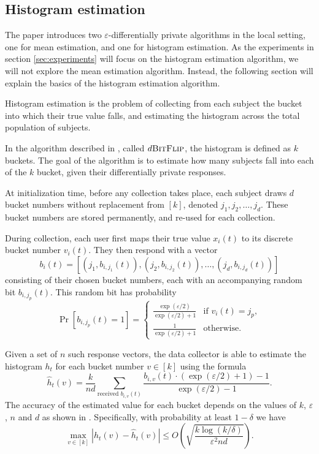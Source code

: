 \documentclass[a4paper,12pt]{article}
\renewcommand{\epsilon}{\varepsilon}
\begin{document}
\subsection{Histogram estimation \label{sec:histogram_algo}}

The paper introduces two $\epsilon$-differentially private algorithms in the local setting, one for mean estimation, and one for histogram estimation. As the experiments in section \ref{sec:experiments} will focus on the histogram estimation algorithm, we will not explore the mean estimation algorithm. Instead, the following section will explain the basics of the histogram estimation algorithm. 

Histogram estimation is the problem of collecting from each subject the bucket into which their true value falls, and estimating the histogram across the total population of subjects.

In the algorithm described in \cite{microsoft_telemetry}, called $d\textsc{BitFlip}$, the histogram is defined as $k$ buckets. The goal of the algorithm is to estimate how many subjects fall into each of the $k$ bucket, given their differentially private responses.

At initialization time, before any collection takes place, each subject draws $d$ bucket numbers without replacement from $[k]$, denoted $j_1,j_2,\dots,j_d$. These bucket numbers are stored permanently, and re-used for each collection.

During collection, each user first maps their true value $x_i(t)$ to its discrete bucket number $v_i(t)$. They then respond with a vector $$b_i(t)=\left[ (j_1, b_{i,j_1}(t)), (j_2, b_{i,j_2}(t)), \dots, (j_d, b_{i,j_d}(t)) \right]$$
consisting of their chosen bucket numbers, each with an accompanying random bit $b_{i,j_p}(t)$. This random bit has probability
$$\Pr[b_{i,j_p}(t)=1]=\begin{cases}
    \frac{\exp(\epsilon/2)}{\exp(\epsilon / 2) + 1} & \text{if } v_i(t) = j_p, \\
    \frac{1}{\exp(\epsilon/2) + 1} & \text{otherwise.}
\end{cases}$$

Given a set of $n$ such response vectors, the data collector is able to estimate the histogram $h_t$ for each bucket number $v \in [k]$ using the formula
\begin{equation*}
    \hat{h}_t(v) = \frac{k}{nd} \sum_{\text{received } b_{i,v}(t)} \frac{b_{i,v}(t)\cdot (\exp(\epsilon/2) + 1) - 1}{\exp(\epsilon/2) - 1}.
\end{equation*}
The accuracy of the estimated value for each bucket depends on the values of $k$, $\epsilon$, $n$ and $d$ as shown in \cite[sec.~2.2]{microsoft_telemetry}. Specifically, with probability at least $1 - \delta$ we have
$$
\max_{v \in [k]} |h_t(v) - \hat{h}_t(v)| \leq O\left( \sqrt{\frac{k \log(k/\delta)}{\epsilon^2nd}} \right).
$$ 
\end{document}
